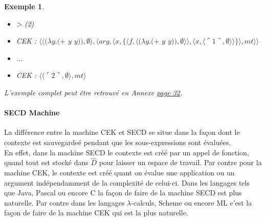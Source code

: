 \documentclass[10pt,a4paper]{report}
\newtheorem{ex}{Exemple}
\begin{document}
\begin{ex}
\begin{itemize}
		\item[] > (2) 
		\item[] CEK : $\langle\langle(\lambda y.(+$ $y$ $y)),\emptyset\rangle,\langle arg,\langle x,\{\langle f,\langle(\lambda y.(+$ $y$ $y)),\emptyset\rangle\rangle,\langle x,\langle\ulcorner 1\urcorner,\emptyset\rangle\rangle\}\rangle,mt\rangle\rangle$
		\item[] ...
		\item[] CEK : $\langle\langle\ulcorner 2\urcorner,\emptyset\rangle,mt\rangle$
	\end{itemize}
	\medbreak
	
	L'exemple complet peut être retrouvé en Annexe \hyperref[CEK]{page 32}.
\end{ex}
\bigbreak


\paragraph{SECD Machine}

La différence entre la machine CEK et SECD se situe dans la façon dont le contexte est sauvegardeé pendant que les sous-expressions sont évaluées.\\
En effet, dans la machine SECD le contexte est créé par un appel de fonction, quand tout est stocké dans $\widehat{D}$ pour laisser un espace de travail. Par contre pour la machine CEK, le contexte est créé quant on évalue une application ou un argument indépendamment de la complexité de celui-ci.
\smallbreak 
Dans les langages tels que Java, Pascal ou encore C la façon de faire de la machine SECD est plus naturelle. Par contre  dans les langages $\lambda$-calculs, Scheme ou encore ML c'est la façon de faire de la machine CEK qui est la plus naturelle.
\medbreak
\end{document}

